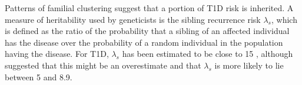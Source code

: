 Patterns of familial clustering suggest that a portion of T1D risk is inherited.
A measure of heritability used by geneticists is the sibling recurrence risk $\lambda_s$, which is defined as
the ratio of the probability that a sibling of an affected individual has the disease over the probability of a random individual in the population
having the disease.
For \gls{T1D}, $\lambda_s$ has been estimated to be close to 15 \citep{Risch:1987wm},
although \citet{Clayton:2009kf} suggested that this might be an overestimate and that $\lambda_s$ is more likely to lie between 5 and 8.9.



